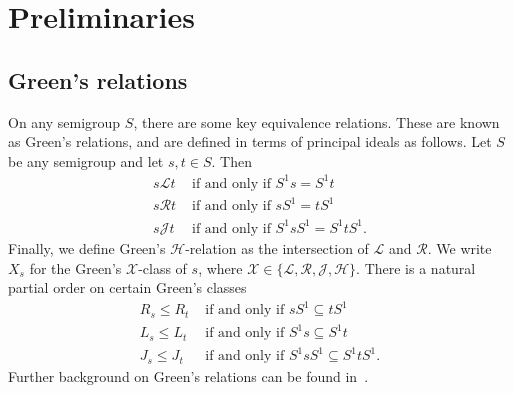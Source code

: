 \documentclass[11pt]{article}
\numberwithin{equation}{section}
\newcommand{\B}{\mathbb{B}}
\newcommand{\Bn}{M_n(\B)}
\newcommand{\Refn}{M_n^{\text{id}}(\B)}
\renewcommand{\L}{\mathscr{L}}
\newcommand{\R}{\mathscr{R}}
\newcommand{\J}{\mathscr{J}}
\renewcommand{\H}{\mathscr{H}}
\begin{document}
%
%

\section{Preliminaries}
\label{section-preliminaries}

\subsection{Green's relations}
On any semigroup $S$, there are some key equivalence relations. These are known
as Green's relations, and are defined in terms of principal ideals as follows.
Let $S$ be any semigroup and let $s, t \in S$. Then
\begin{align*}
  s \L t &\text{ if and only if } S^1 s = S^1 t \\
  s \R t &\text{ if and only if } s S^1 = t S^1 \\
  s \J t &\text{ if and only if } S^1 s S^1 = S^1 t S^1.
\end{align*}
Finally, we define Green's $\H$-relation as the intersection of $\L$ and $\R$.
We write $X_s$ for the Green's $\mathcal{X}$-class of $s$, where
$\mathcal{X} \in \{\L, \R, \J, \H\}$.
There is a natural partial order on certain Green's classes
\begin{align*}
  R_s \leq R_t &\text{ if and only if } sS^1 \subseteq tS^1 \\
  L_s \leq L_t &\text{ if and only if } S^1s \subseteq S^1t \\
  J_s \leq J_t &\text{ if and only if } S^1 s S^1 \subseteq S^1 t S^1.
\end{align*}
Further background on Green's relations can be found in~\cite{Howie1995aa}.
\end{document}
